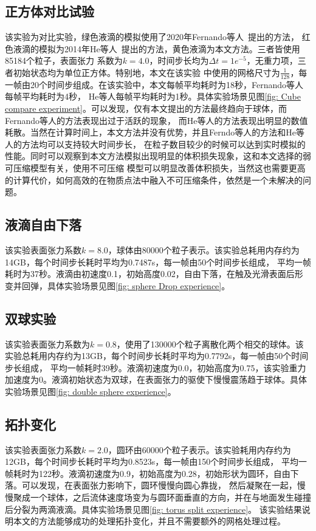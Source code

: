 \subsection{正方体对比试验}
该实验为对比实验，绿色液滴的模拟使用了2020年Fernando等人~\cite{Zorrilla2020AcceleratingST}提出的方法，
红色液滴的模拟为2014年He等人~\cite{He2014}提出的方法，黄色液滴为本文方法。三者皆使用85184个粒子，表面张力
系数为$k = 4.0$，时间步长均为$\Delta t = 1e^{-5}$，无重力项，三者初始状态均为单位正方体。特别地，本文在该实验
中使用的网格尺寸为$\frac{1}{128}$，每一帧由20个时间步组成。在该实验中，本文每帧平均耗时为18秒，Fernando等人每帧平均耗时为4秒，
He等人每帧平均耗时为1秒。具体实验场景见图\ref{fig: Cube compare experiment}。可以发现，仅有本文提出的方法最终趋向于球体，而Fernando等人的方法表现出过于活跃的现象，
而He等人的方法表现出明显的数值耗散。当然在计算时间上，本文方法并没有优势，并且Ferndo等人的方法和He等人的方法均可以支持较大时间步长，
在粒子数目较少的时候可以达到实时模拟的性能。同时可以观察到本文方法模拟出现明显的体积损失现象，这和本文选择的弱可压缩模型有关，使用不可压缩
模型可以明显改善体积损失，当然这也需要更高的计算代价，如何高效的在物质点法中融入不可压缩条件，依然是一个未解决的问题。

\subsection{液滴自由下落}
该实验表面张力系数$k = 8.0$，球体由80000个粒子表示。该实验总耗用内存约为14GB，每个时间步长耗时平均为0.7487s，每一帧由50个时间步长组成，
平均一帧耗时为37秒。液滴由初速度0.1，初始高度0.02，自由下落，在触及光滑表面后形变并回弹，具体实验场景见图\ref{fig: sphere Drop experience}。


\subsection{双球实验}
该实验表面张力系数为$k = 0.8$，使用了130000个粒子离散化两个相交的球体。该实验总耗用内存约为13GB，每个时间步长耗时平均为0.7792s，每一帧由50个时间步长组成，
平均一帧耗时39秒。液滴初速度为0.0，初始高度为0.75，该实验重力加速度为0。液滴初始状态为双球，在表面张力的驱使下慢慢震荡趋于球体。具体实验场景见图\ref{fig: double sphere experience}。

\subsection{拓扑变化}
该实验表面张力系数$k = 2.0$，圆环由60000个粒子表示。该实验耗用内存约为12GB，每个时间步长耗时平均为0.8523s，每一帧由150个时间步长组成，
平均一帧耗时为122秒。液滴初速度为0.9，初始高度为0.28，初始形状为圆环，自由下落。可以发现，在表面张力影响下，圆环慢慢向圆心靠拢，
然后凝聚在一起，慢慢聚成一个球体，之后流体速度场变为与圆环面垂直的方向，并在与地面发生碰撞后分裂为两滴液滴。具体实验场景见图\ref{fig: torus split experience}。
该实验结果说明本文的方法能够成功的处理拓扑变化，并且不需要额外的网格处理过程。

